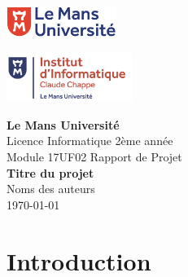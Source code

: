 \documentclass[12pt,a4paper, twoside]{article}
\begin{document}
\begin{titlepage}
    \begin{minipage}[t]{0.48\textwidth}
        \includegraphics[height=1.01cm]{logolemansU.png}
    \end{minipage}
    \hfill
    \begin{minipage}[t]{0.25\textwidth}
        \includegraphics[height=1.6cm]{logo_IC2.png}
    \end{minipage}
    
    \vspace{2cm}
    \begin{center}
        \Large\textbf{Le Mans Université}\\
        \vspace{0.5cm}
        Licence Informatique 2ème année\\
        Module 17UF02 Rapport de Projet\\
        \vspace{0.5cm}
        \Large\textbf{Titre du projet}\\
        \vspace{1cm}
        {\large Noms des auteurs}\\
        \vspace{0.5cm}
        {\normalsize \today} 
    \end{center}
\end{titlepage}

\newpage
\tableofcontents
\newpage
{}
\section{Introduction}
\end{document}

